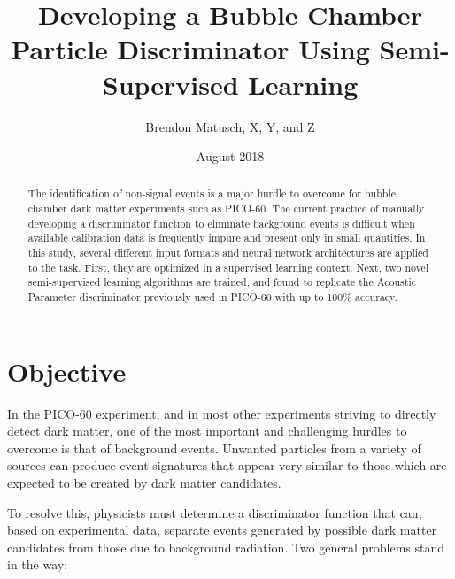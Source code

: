 \documentclass[10pt]{article}
\begin{document}
\title{Developing a Bubble Chamber Particle Discriminator Using Semi-Supervised Learning}
\author{Brendon Matusch, X, Y, and Z}
\date{August 2018}
\maketitle

\begin{abstract}
    The identification of non-signal events is a major hurdle to overcome for bubble chamber dark matter experiments such as PICO-60. The current practice of manually developing a discriminator function to eliminate background events is difficult when available calibration data is frequently impure and present only in small quantities. In this study, several different input formats and neural network architectures are applied to the task. First, they are optimized in a supervised learning context. Next, two novel semi-supervised learning algorithms are trained, and found to replicate the Acoustic Parameter discriminator previously used in PICO-60 with up to 100\% accuracy.
\end{abstract}

\section{Objective}

In the PICO-60 experiment, and in most other experiments striving to directly detect dark matter, one of the most important and challenging hurdles to overcome is that of background events. Unwanted particles from a variety of sources can produce event signatures that appear very similar to those which are expected to be created by dark matter candidates.

To resolve this, physicists must determine a discriminator function that can, based on experimental data, separate events generated by possible dark matter candidates from those due to background radiation. Two general problems stand in the way:
\end{document}
